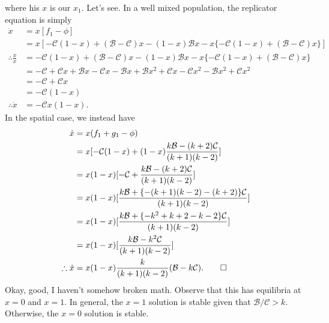 \documentclass[13pt]{amsart}
\newcommand{\B}{\mathcal{B}}
\newcommand{\C}{\mathcal{C}}
\begin{document}
where his $x$ is our $x_1$.
Let's see.
In a well mixed population, the replicator equation is simply
\begin{equation}
    \begin{split}
        \dot{x} & = x[f_1 - \phi]
        \\
        & = x[-\C (1-x) + (\B - \C)x - (1-x) \B x - x\{ -\C(1-x) + (\B - \C) x \} ]
        \\
        \therefore \frac{\dot{x}}{x} & = -\C (1-x) + (\B - \C)x - (1-x) \B x - x\{ -\C(1-x) + (\B - \C) x \}
        \\
        & = -\C + \C x + \B x - \C x - \B x + \B x^2 + \C x - \C x^2 - \B x^2 + \C x^2
        \\
        & = -\C + \C x
        \\
        & = -\C (1 - x)
        \\
        \therefore \dot{x} & = -\C x (1-x).
    \end{split}
\end{equation}
In the spatial case, we instead have
\begin{equation}
    \begin{split}
        \dot{x} & = x(f_1 + g_1 - \phi)
        \\
        & = x[-\C (1 - x) + (1-x)\frac{k \B - (k+2) \C}{(k+1)(k-2)}]
        \\
        & = x(1-x)[-\C + \frac{k \B - (k+2) \C}{(k+1)(k-2)}]
        \\
        & = x(1-x)[\frac{k \B + \{-(k+1)(k-2) - (k+2)\}\C}{(k+1)(k-2)}]
        \\
        & = x(1-x)[\frac{k \B + \{-k^2 + k + 2 - k - 2\}\C}{(k+1)(k-2)}]
        \\
        & = x(1-x)[\frac{k \B - k^2\C}{(k+1)(k-2)}]
        \\
        \therefore \dot{x} & = x(1-x) \frac{k}{(k+1)(k-2)}(\B - k\C). \qed
    \end{split}
\end{equation}
Okay, good, I haven't somehow broken math.
Observe that this has equilibria at $x = 0$ and $x = 1$.
In general, the $x = 1$ solution is stable given that $\B/\C > k$.
Otherwise, the $x = 0$ solution is stable.
\end{document}
